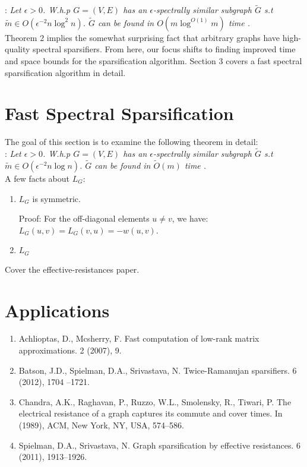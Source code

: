\documentclass{article}
\begin{document}
\noindent
{}: \textit{Let $\epsilon > 0$. W.h.p $G =
(V, E)$ has an $\epsilon$-spectrally similar subgraph $\tilde{G}$ s.t
$\tilde{m} \in O(\epsilon^{-2}n\log^2 n)$. $\tilde{G}$ can be found in
$O(m\log^{O(1)}m)$ time \cite{SpielmanTeng} \cite{TheSurvey}.} \\

Theorem 2 implies the somewhat surprising fact that arbitrary graphs have
high-quality spectral sparsifiers. From here, our focus shifts to finding
improved time and space bounds for the sparsification algorithm. Section 3
covers a fast spectral sparsification algorithm in detail.

\section{Fast Spectral Sparsification}

The goal of this section is to examine the following theorem in detail: \\

\noindent
{}: \textit{Let $\epsilon > 0$.
W.h.p $G = (V, E)$ has an $\epsilon$-spectrally similar subgraph $\tilde{G}$
s.t $\tilde{m} \in O(\epsilon^{-2}n\log n)$. $\tilde{G}$ can be found in
$\tilde{O}(m)$ time \cite{SpielmanSrivastava} \cite{TheSurvey}.} \\

A few facts about $L_G$:
\begin{enumerate}[1.]
    \item $L_G$ is symmetric.

        Proof: For the off-diagonal elements $u \not= v$, we have: $L_G(u,
        v) = L_G(v, u) = -w(u, v)$.

    \item $L_G$ 
\end{enumerate}

Cover the effective-resistances paper.

\section{Applications}




\begin{enumerate}[1.]
    \item Achlioptas, D., Mcsherry, F. Fast computation of low-rank matrix
        approximations. 2 (2007), 9.

    \item Batson, J.D., Spielman, D.A., Srivastava, N.  Twice-Ramanujan
        sparsifiers. 6 (2012), 1704 –1721.

    \item Chandra, A.K., Raghavan, P., Ruzzo, W.L., Smolensky, R., Tiwari,
        P.  The electrical resistance of a graph captures its commute and
        cover times. In (1989), ACM, New York, NY, USA, 574–586.

    \item Spielman, D.A., Srivastava, N. Graph sparsification by effective
        resistances.  6 (2011), 1913–1926.
\end{enumerate}
\end{document}
